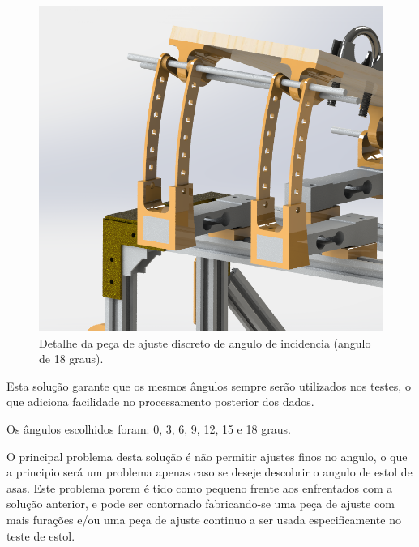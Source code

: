 \begin{figure}[!ht]
    \centering
    \includegraphics[width=.8\linewidth]{figuras/renders/detalhe_ajuste_angulo_18_graus.png}
    \caption{Detalhe da peça de ajuste discreto de angulo de incidencia (angulo de 18 graus)\cite{autor}.}
    \label{fig:peca_angulo_18}
\end{figure}

Esta solução garante que os mesmos ângulos sempre serão utilizados nos testes, o que adiciona facilidade no processamento posterior dos dados.

Os ângulos escolhidos foram: 0, 3, 6, 9, 12, 15 e 18 graus.

O principal problema desta solução é não permitir ajustes finos no angulo, o que a principio será um problema apenas caso se deseje descobrir o angulo de estol de asas. Este problema porem é tido como pequeno frente aos enfrentados com a solução anterior, e pode ser contornado fabricando-se uma peça de ajuste com mais furações e/ou uma peça de ajuste continuo a ser usada especificamente no teste de estol.